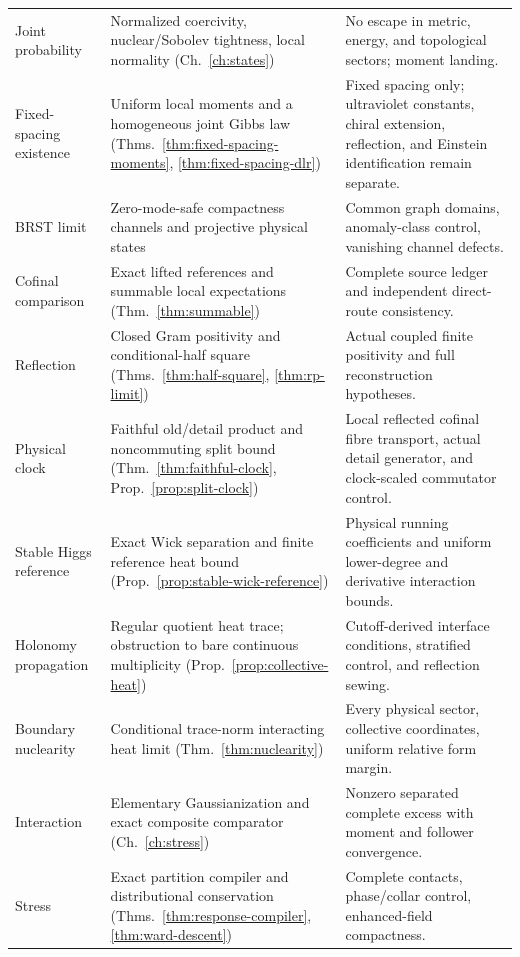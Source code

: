 \documentclass[11pt,a4paper,oneside]{book}
\theoremstyle{plain}
\theoremstyle{definition}
\theoremstyle{remark}
\begin{document}
\begin{longtable}{@{}>{\raggedright\arraybackslash}p{}>{\raggedright\arraybackslash}p{}>{\raggedright\arraybackslash}p{}@{}}
Joint probability & Normalized coercivity, nuclear/Sobolev tightness, local normality (Ch.~\ref{ch:states}) & No escape in metric, energy, and topological sectors; moment landing.\\[1pt]
Fixed-spacing existence & Uniform local moments and a homogeneous joint Gibbs law (Thms.~\ref{thm:fixed-spacing-moments}, \ref{thm:fixed-spacing-dlr}) & Fixed spacing only; ultraviolet constants, chiral extension, reflection, and Einstein identification remain separate.\\[1pt]
BRST limit & Zero-mode-safe compactness channels and projective physical states & Common graph domains, anomaly-class control, vanishing channel defects.\\[1pt]
Cofinal comparison & Exact lifted references and summable local expectations (Thm.~\ref{thm:summable}) & Complete source ledger and independent direct-route consistency.\\[1pt]
Reflection & Closed Gram positivity and conditional-half square (Thms.~\ref{thm:half-square}, \ref{thm:rp-limit}) & Actual coupled finite positivity and full reconstruction hypotheses.\\[1pt]
Physical clock & Faithful old/detail product and noncommuting split bound (Thm.~\ref{thm:faithful-clock}, Prop.~\ref{prop:split-clock}) & Local reflected cofinal fibre transport, actual detail generator, and clock-scaled commutator control.\\[1pt]
Stable Higgs reference & Exact Wick separation and finite reference heat bound (Prop.~\ref{prop:stable-wick-reference}) & Physical running coefficients and uniform lower-degree and derivative interaction bounds.\\[1pt]
Holonomy propagation & Regular quotient heat trace; obstruction to bare continuous multiplicity (Prop.~\ref{prop:collective-heat}) & Cutoff-derived interface conditions, stratified control, and reflection sewing.\\[1pt]
Boundary nuclearity & Conditional trace-norm interacting heat limit (Thm.~\ref{thm:nuclearity}) & Every physical sector, collective coordinates, uniform relative form margin.\\[1pt]
Interaction & Elementary Gaussianization and exact composite comparator (Ch.~\ref{ch:stress}) & Nonzero separated complete excess with moment and follower convergence.\\[1pt]
Stress & Exact partition compiler and distributional conservation (Thms.~\ref{thm:response-compiler}, \ref{thm:ward-descent}) & Complete contacts, phase/collar control, enhanced-field compactness.\\[1pt]

\end{longtable}
\end{document}
